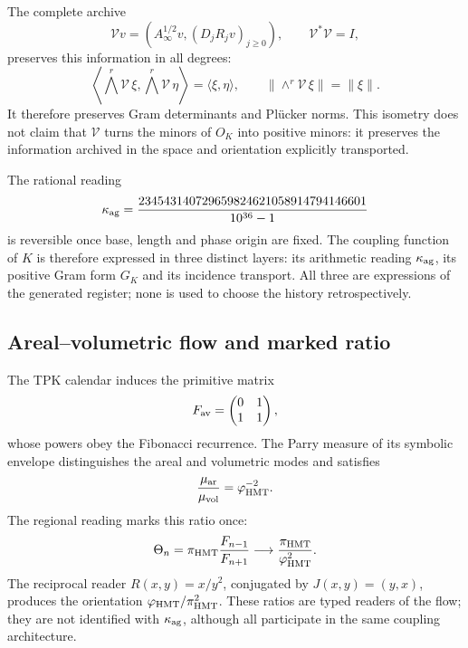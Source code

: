 The complete archive
\[
 \mathcal Vv=\left(A_\infty^{1/2}v,(D_jR_jv)_{j\ge0}\right),
 \qquad\mathcal V^*\mathcal V=I,
\]
preserves this information in all degrees:
\begin{equation}
 \left\langle\bigwedge^r\mathcal V\,\xi,
 \bigwedge^r\mathcal V\,\eta\right\rangle
 =\langle\xi,\eta\rangle,
 \qquad
 \|\wedge^r\mathcal V\,\xi\|=\|\xi\|.
 \label{geometria_positiva:eq:exterior-isometry}
\end{equation}
It therefore preserves Gram determinants and Plücker norms. This isometry does not claim that \(\mathcal V\) turns the minors of \(O_K\) into positive minors: it preserves the information archived in the space and orientation explicitly transported.

The rational reading
\[
 \kappa_{\rm ag}=
 \frac{234543140729659824621058914794146601}{10^{36}-1}
\]
is reversible once base, length and phase origin are fixed. The coupling function of \(K\) is therefore expressed in three distinct layers: its arithmetic reading \(\kappa_{\rm ag}\), its positive Gram form \(G_K\) and its incidence transport. All three are expressions of the generated register; none is used to choose the history retrospectively.

\subsection{Areal--volumetric flow and marked ratio}

The TPK calendar induces the primitive matrix
\[
 F_{\rm av}=\begin{pmatrix}0&1\\1&1\end{pmatrix},
\]
whose powers obey the Fibonacci recurrence. The Parry measure of its symbolic envelope distinguishes the areal and volumetric modes and satisfies
\begin{equation}
 \frac{\mu_{\rm ar}}{\mu_{\rm vol}}=\varphi_{\rm HMT}^{-2}.
 \label{geometria_positiva:eq:area-volume-ratio}
\end{equation}
The regional reading marks this ratio once:
\begin{equation}
 \Theta_n=\pi_{\rm HMT}\frac{F_{n-1}}{F_{n+1}}
 \longrightarrow\frac{\pi_{\rm HMT}}{\varphi_{\rm HMT}^2}.
 \label{geometria_positiva:eq:marked-area-volume}
\end{equation}
The reciprocal reader \(R(x,y)=x/y^2\), conjugated by \(J(x,y)=(y,x)\), produces the orientation \(\varphi_{\rm HMT}/\pi_{\rm HMT}^2\). These ratios are typed readers of the flow; they are not identified with \(\kappa_{\rm ag}\), although all participate in the same coupling architecture.

